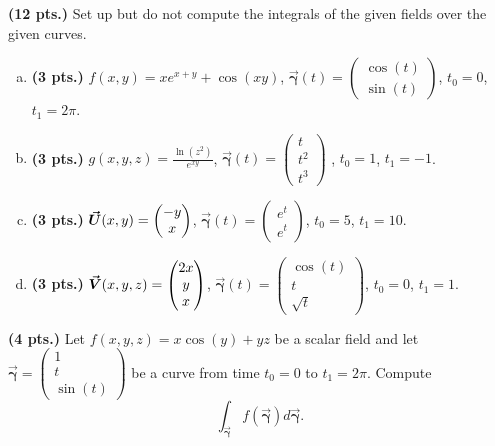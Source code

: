 \documentclass[12pt]{article} %
\newcommand{\curvegamma}{\boldsymbol{\vec{\gamma}}}
\begin{document}
\begin{problem}
\textbf{(12 pts.)} Set up but do not compute the integrals of the given fields over the given curves.
    \begin{enumerate}[(a)]
        \item \textbf{(3 pts.)} $f(x,y) = xe^{x+y}+\cos(xy)$, $\curvegamma(t) = \begin{pmatrix} \cos(t) \\ \sin(t) \end{pmatrix}$, $t_0 = 0$, $t_1=2\pi$.
        \item \textbf{(3 pts.)} $g(x,y,z) = \frac{\ln(z^2)}{e^{xy}}$, $\curvegamma(t) = \begin{pmatrix} t \\ t^2 \\ t^3 \end{pmatrix}$ , $t_0 = 1$, $t_1=-1$.
        \item \textbf{(3 pts.)} $\boldsymbol{\vec{U}}(x,y) = \begin{pmatrix} -y \\ x \end{pmatrix}$, $\curvegamma(t) = \begin{pmatrix} e^t \\ e^t \end{pmatrix}$, $t_0 = 5$, $t_1=10$.
        \item \textbf{(3 pts.)} $\boldsymbol{\vec{V}}(x,y,z) = \begin{pmatrix} 2x \\ y \\ x \end{pmatrix}$, $\curvegamma(t) = \begin{pmatrix} \cos(t) \\ t \\ \sqrt{t} \end{pmatrix}$, $t_0 = 0$, $t_1=1$.
    \end{enumerate}
\end{problem}

\vspace*{0.5cm}

\begin{problem}
\textbf{(4 pts.)} Let $f(x,y,z)=x \cos(y) + yz$ be a scalar field and let $\curvegamma = \begin{pmatrix} 1 \\ t \\ \sin(t) \end{pmatrix}$ be a curve from time $t_0 = 0$ to $t_1 = 2 \pi$. Compute
\[
    \int_{\curvegamma} f(\curvegamma)d\curvegamma.
\]
\end{problem}
\end{document}
